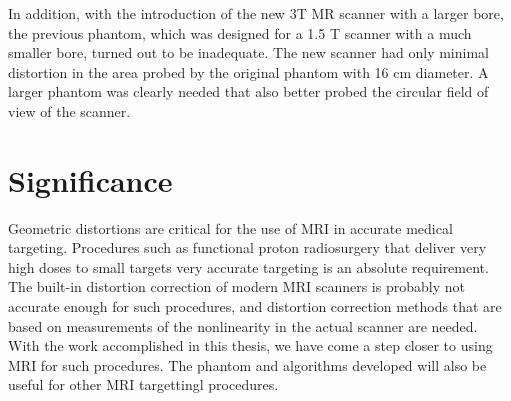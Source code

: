 In addition, with the introduction of the new 3T MR scanner with a larger bore, the previous phantom, which was designed for a 1.5 T scanner with a much smaller bore, turned out to be inadequate. The new scanner had only minimal distortion in the area probed by the original phantom with 16 cm diameter. A larger phantom was clearly needed that also better probed the circular field of view of the scanner.

\section{Significance}

Geometric distortions are critical for the use of MRI in accurate medical targeting. Procedures such as functional proton radiosurgery that deliver very high doses to small targets very accurate targeting is an absolute requirement. The built-in distortion correction of modern MRI scanners is probably not accurate enough for such procedures, and distortion correction methods that are based on measurements of the nonlinearity in the actual scanner are needed. With the work accomplished in this thesis, we have come a step closer to using MRI for such procedures. The phantom and algorithms developed will also be useful for other MRI targettingl procedures.






